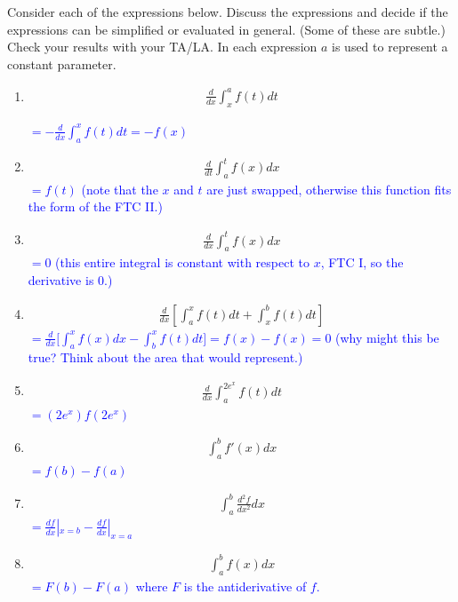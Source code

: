 \documentclass{ximera}
\begin{document}
\begin{exercise}
    Consider each of the expressions below. Discuss the expressions and decide if the expressions can be simplified or evaluated in general. (Some of these are subtle.) Check your results with your TA/LA. In each expression $a$ is used to represent a constant parameter.
    \begin{enumerate}
        \item \begin{align}	\frac{d}{dx} \int_{x}^a f(t)dt \nonumber\end{align}
        
        \textcolor{blue}{ $=-\frac{d}{dx}\int_{a}^x f(t)dt=-f(x)$}

        \item \begin{align}	\frac{d}{dt} \int_{a}^t f(x)dx \nonumber\end{align}
        \textcolor{blue}{ $=f(t)$ (note that the $x$ and $t$ are just swapped, otherwise this function fits the form of the FTC II.)}

        \item \begin{align}	\frac{d}{dx} \int_{a}^t f(x)dx \nonumber\end{align}
        \textcolor{blue}{ $=0$ (this entire integral is constant with respect to $x$, FTC I, so the derivative is 0.)} 

        \item \begin{align}	\frac{d}{dx}\left[ \int_{a}^x f(t)dt +  \int_{x}^b f(t)dt\right] \nonumber\end{align}
        \textcolor{blue}{ $=\frac{d}{dx}\bigg[\int_a^x f(x)dx-\int_b^x f(t)dt\bigg]=f(x)-f(x)=0$ (why might this be true?  Think about the area that would represent.)}

        \item \begin{align}   \frac{d}{dx} \int_{a}^{2e^x} f(t)d \nonumber t\end{align}
        \textcolor{blue}{ $=(2e^x)f(2e^{x})$}

        \item\begin{align}	\int_{a}^b f'(x)dx \nonumber\end{align}
        \textcolor{blue}{ $=f(b)-f(a)$}

        \item\begin{align}	\int_{a}^b \frac{d^2f}{dx^2}dx \nonumber\end{align}
        \textcolor{blue}{ $=\frac{df}{dx}|_{x=b}-\frac{df}{dx}|_{x=a}$}
        \item\begin{align}	\int_{a}^b f(x) dx \nonumber\end{align}
        \textcolor{blue}{ $=F(b)-F(a)$ where $F$ is the antiderivative of $f$.}

    \end{enumerate}
\end{exercise}
\end{document}
